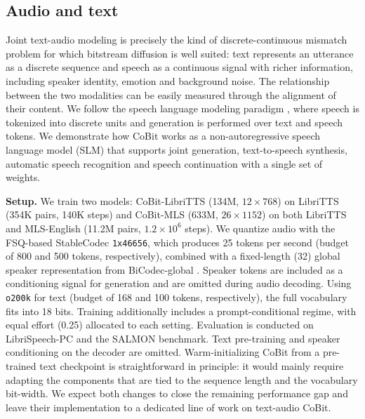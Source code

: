 \subsection{Audio and text}
\label{sec:exp:audio}

Joint text-audio modeling is precisely the kind of discrete-continuous mismatch problem for which bitstream diffusion is well suited: text represents an utterance as a discrete sequence and speech as a continuous signal with richer information, including speaker identity, emotion and background noise. The relationship between the two modalities can be easily measured through the alignment of their content. We follow the speech language modeling paradigm \citep{audio:twist, audio:spirit-lm}, where speech is tokenized into discrete units and generation is performed over text and speech tokens. We demonstrate how CoBit works as a non-autoregressive speech language model (SLM) that supports joint generation, text-to-speech synthesis, automatic speech recognition and speech continuation with a single set of weights.

\textbf{Setup.} We train two models: CoBit-LibriTTS (134M, $12\times768$) on LibriTTS \citep{audio:libritts} (354K pairs, 140K steps) and CoBit-MLS (633M, $26\times1152$) on both LibriTTS and MLS-English \citep{audio:mls} (11.2M pairs, $1.2\times10^6$ steps). We quantize audio with the FSQ-based StableCodec \texttt{1x46656}, which produces 25 tokens per second (budget of 800 and 500 tokens, respectively), combined with a fixed-length (32) global speaker representation from BiCodec-global \citep{audio:spark-tts}. Speaker tokens are included as a conditioning signal for generation and are omitted during audio decoding. Using \texttt{o200k} for text (budget of 168 and 100 tokens, respectively), the full vocabulary fits into 18 bits. Training additionally includes a prompt-conditional regime, with equal effort (0.25) allocated to each setting. Evaluation is conducted on LibriSpeech-PC \citep{audio:librispeech-pc} and the SALMON benchmark. Text pre-training and speaker conditioning on the decoder are omitted. Warm-initializing CoBit from a pre-trained text checkpoint is straightforward in principle: it would mainly require adapting the components that are tied to the sequence length and the vocabulary bit-width. We expect both changes to close the remaining performance gap and leave their implementation to a dedicated line of work on text-audio CoBit.

